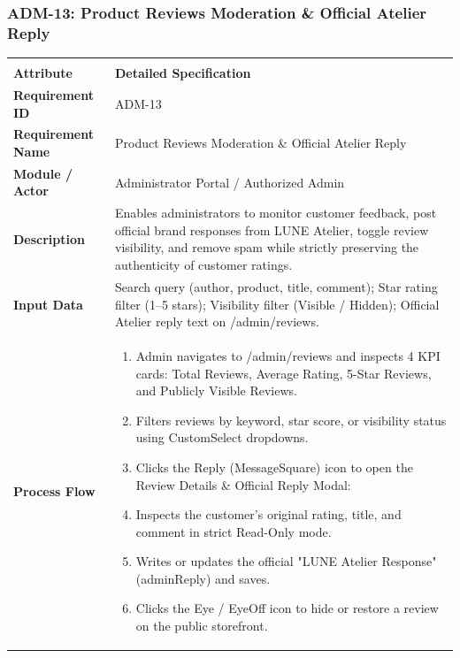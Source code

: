 \documentclass[12pt,a4paper,oneside]{report}
\begin{document}
\subsubsection{ADM-13: Product Reviews Moderation \& Official Atelier Reply}
\begin{longtable}{|p{3.6cm}|p{11.9cm}|}
\hline
\rowcolor{PrimaryBrown}
\multicolumn{2}{|p{15.5cm}|}{\textbf{\textcolor{white}{Functional Specification: ADM-13 -- Product Reviews Moderation \& Official Atelier Reply}}} \\
\hline
\endfirsthead
\hline
\rowcolor{PrimaryBrown}
\multicolumn{2}{|p{15.5cm}|}{\textbf{\textcolor{white}{Functional Specification: ADM-13 (Continued)}}} \\
\hline
\textbf{Attribute} & \textbf{Detailed Specification} \\
\hline
\endhead
\hline
\endfoot
\textbf{Requirement ID} & ADM-13 \\
\hline
\textbf{Requirement Name} & Product Reviews Moderation \& Official Atelier Reply \\
\hline
\textbf{Module / Actor} & Administrator Portal / Authorized Admin \\
\hline
\textbf{Description} & Enables administrators to monitor customer feedback, post official brand responses from LUNE Atelier, toggle review visibility, and remove spam while strictly preserving the authenticity of customer ratings. \\
\hline
\textbf{Input Data} & Search query (author, product, title, comment); Star rating filter (1--5 stars); Visibility filter (Visible / Hidden); Official Atelier reply text on /admin/reviews. \\
\hline
\textbf{Process Flow} & \begin{enumerate}[leftmargin=*,nosep,topsep=2pt]
  \item Admin navigates to /admin/reviews and inspects 4 KPI cards: Total Reviews, Average Rating, 5-Star Reviews, and Publicly Visible Reviews.
  \item Filters reviews by keyword, star score, or visibility status using CustomSelect dropdowns.
  \item Clicks the Reply (MessageSquare) icon to open the Review Details \& Official Reply Modal:
  \item Inspects the customer's original rating, title, and comment in strict Read-Only mode.
  \item Writes or updates the official "LUNE Atelier Response" (adminReply) and saves.
  \item Clicks the Eye / EyeOff icon to hide or restore a review on the public storefront.

\end{enumerate}
\end{longtable}
\end{document}

